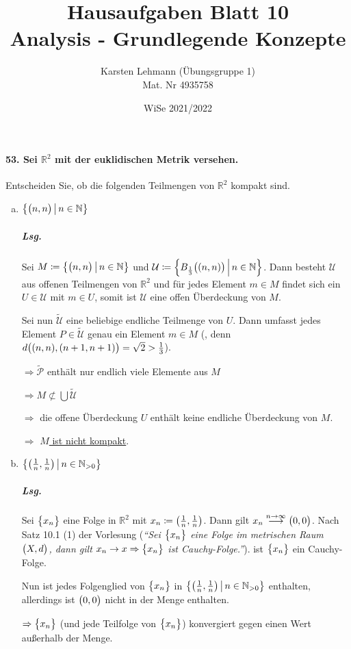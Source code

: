 \documentclass{scrreprt}
\author{Karsten Lehmann (Übungsgruppe 1)\\Mat. Nr 4935758}
\date{WiSe 2021/2022}
\title{Hausaufgaben Blatt 10\\Analysis - Grundlegende Konzepte}
\begin{document}
\paragraph{53. Sei $\mathbb{R}^2$ mit der euklidischen Metrik versehen.}
Entscheiden Sie, ob die folgenden Teilmengen von $\mathbb{R}^2$ kompakt sind.
\begin{enumerate}[(a)]
\item $\qty\big{\qty\big(n, n) \,{\big |}\, n \in \mathbb{N}}$

  \subparagraph{Lsg.} Sei
  $M \coloneqq \qty\big{\qty\big(n, n) \,{\big |}\, n \in \mathbb{N}}$
  und $\mathcal{U} \coloneqq
  \qty{B_{\frac{1}{3}}\qty\big(\qty(n, n)) \,\middle|\, n \in \mathbb{N}}$.
  Dann besteht $\mathcal{U}$ aus offenen Teilmengen von $\mathbb{R}^2$ und
  für jedes Element $m \in M$ findet sich ein $U \in \mathcal{U}$ mit
  $m \in U$, somit ist $\mathcal{U}$ eine offen Überdeckung von $M$.

  Sei nun $\tilde{\mathcal{U}}$ eine beliebige endliche Teilmenge von $U$.
  Dann umfasst jedes Element $P \in \tilde{\mathcal{U}}$ genau ein Element
  $m \in M$ (, denn
  $d\qty\big((n, n), (n + 1, n + 1)) = \sqrt{2} > \frac{1}{3}$).

  $\Rightarrow \tilde{\mathcal{P}}$ enthält nur endlich viele Elemente aus $M$

  $\Rightarrow M \not\subset \bigcup \tilde{\mathcal{U}}$

  $\Rightarrow$ die offene Überdeckung $U$ enthält keine endliche
  Überdeckung von $M$.

  $\Rightarrow$ \underline{$M$ ist nicht kompakt}.

\item $\qty{\qty(\frac{1}{n}, \frac{1}{n}) \,\middle |\, n \in \mathbb{N}_{> 0}}$

  \subparagraph{Lsg.} Sei $\qty\big{x_n}$ eine Folge in $\mathbb{R}^2$ mit
  $x_n \coloneqq \qty(\frac{1}{n}, \frac{1}{n})$.
  Dann gilt $x_n \overset{n \to \infty}\longrightarrow \qty\big(0, 0)$.
  Nach Satz 10.1 (1) der Vorlesung (\emph{``Sei $\qty\big{x_n}$ eine Folge im
    metrischen Raum $\qty\big(X, d)$, dann gilt
    $x_n \to x \Rightarrow \qty\big{x_n}$ ist Cauchy-Folge.''}).
  ist $\qty\big{x_n}$ ein Cauchy-Folge.

  Nun ist jedes Folgenglied von $\qty\big{x_n}$ in
  $\qty{\qty(\frac{1}{n}, \frac{1}{n}) \,\middle |\, n \in \mathbb{N}_{> 0}}$
  enthalten, allerdings ist $\qty\big(0, 0)$ nicht in der Menge enthalten.

  $\Rightarrow \qty\big{x_n}$ (und jede Teilfolge von $\qty\big{x_n}$)
  konvergiert gegen einen Wert außerhalb der Menge.


\end{enumerate}
\end{document}
